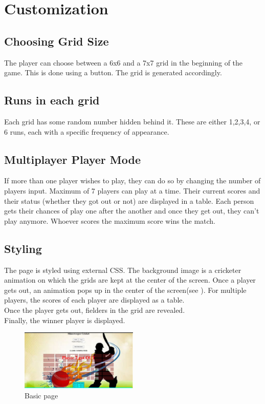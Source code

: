 \documentclass{article}
\begin{document}
\section{Customization}


\subsection{Choosing Grid Size}
The player can choose between a 6x6 and a 7x7 grid in the beginning of the game. This is done using a button. The grid is generated accordingly.

\subsection{Runs in each grid}
Each grid has some random number hidden behind it. These are either 1,2,3,4, or 6 runs, each with a specific frequency of appearance.



\subsection{Multiplayer Player Mode}
\label{mul}

If more than one player wishes to play, they can do so by changing the number of players input. Maximum of 7 players can play at a time. Their current scores and their status (whether they got out or not) are displayed in a table.
Each person gets their chances of play one after the another and once they get out, they can't play anymore. Whoever scores the maximum score wins the match.

\subsection{Styling}
The page is styled using external CSS. The background image is a cricketer animation on which the grids are kept at the center of the screen.
Once a player gets out, an animation pops up in the center of the screen(see \fig[\ref{fig:animation}]). For multiple players, the scores of each player are displayed as a table.\\
Once the player gets out, fielders in the grid are revealed.\\
Finally, the winner player is displayed. 
\begin{figure}[h!]
    \centering
    \includegraphics[width=0.5\textwidth]{animation.jpg}
    \caption{Basic page}
    \label{fig:animation}
\end{figure}
\end{document}
